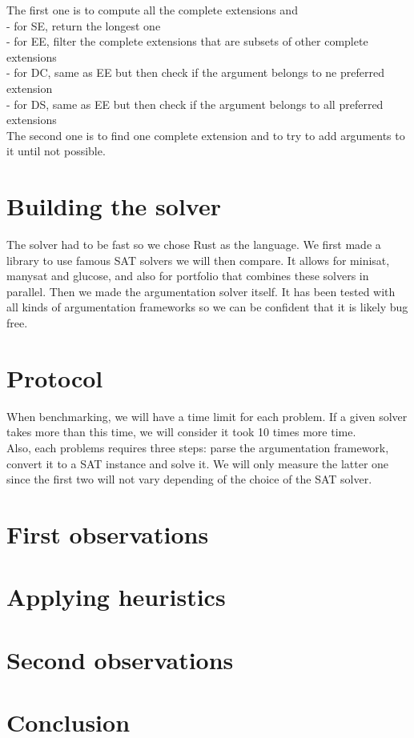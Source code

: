 \documentclass[11pt]{article}
\begin{document}
The first one is to compute all the complete extensions and \\
 - for SE, return the longest one \\
 - for EE, filter the complete extensions that are subsets of other complete extensions \\
 - for DC, same as EE but then check if the argument belongs to ne preferred extension \\
 - for DS, same as EE but then check if the argument belongs to all preferred extensions \\
The second one is to find one complete extension and to try to add arguments to it until not possible.

\section{Building the solver}
The solver had to be fast so we chose Rust as the language. We first made a library\cite{portfoliolib} to use famous SAT solvers we will then compare. It allows for minisat, manysat and glucose, and also for portfolio that combines these solvers in parallel. Then we made the argumentation solver itself\cite{argsolver}. It has been tested with all kinds of argumentation frameworks so we can be confident that it is likely bug free.

\section{Protocol}
When benchmarking, we will have a time limit for each problem. If a given solver takes more than this time, we will consider it took 10 times more time. \\
Also, each problems requires three steps: parse the argumentation framework, convert it to a SAT instance and solve it. We will only measure the latter one since the first two will not vary depending of the choice of the SAT solver.

\section{First observations}

\section{Applying heuristics}

\section{Second observations}

\section{Conclusion}



\end{document}

